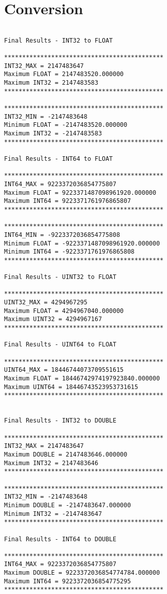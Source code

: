 \chapter{Conversion}

\begin{verbatim}

Final Results - INT32 to FLOAT

********************************************
INT32_MAX = 2147483647
Maximum FLOAT = 2147483520.000000
Maximum INT32 = 2147483583
********************************************

********************************************
INT32_MIN = -2147483648
Minimum FLOAT = -2147483520.000000
Maximum INT32 = -2147483583
********************************************

Final Results - INT64 to FLOAT

********************************************
INT64_MAX = 9223372036854775807
Maximum FLOAT = 9223371487098961920.000000
Maximum INT64 = 9223371761976865807
********************************************

********************************************
INT64_MIN = -9223372036854775808
Minimum FLOAT = -9223371487098961920.000000
Minimum INT64 = -9223371761976865808
********************************************

Final Results - UINT32 to FLOAT

********************************************
UINT32_MAX = 4294967295
Maximum FLOAT = 4294967040.000000
Maximum UINT32 = 4294967167
********************************************

Final Results - UINT64 to FLOAT

********************************************
UINT64_MAX = 18446744073709551615
Maximum FLOAT = 18446742974197923840.000000
Maximum UINT64 = 18446743523953731615
********************************************


Final Results - INT32 to DOUBLE

********************************************
INT32_MAX = 2147483647
Maximum DOUBLE = 2147483646.000000
Maximum INT32 = 2147483646
********************************************

********************************************
INT32_MIN = -2147483648
Minimum DOUBLE = -2147483647.000000
Minimum INT32 = -2147483647
********************************************

Final Results - INT64 to DOUBLE

********************************************
INT64_MAX = 9223372036854775807
Maximum DOUBLE = 9223372036854774784.000000
Maximum INT64 = 9223372036854775295
********************************************


\end{verbatim}
